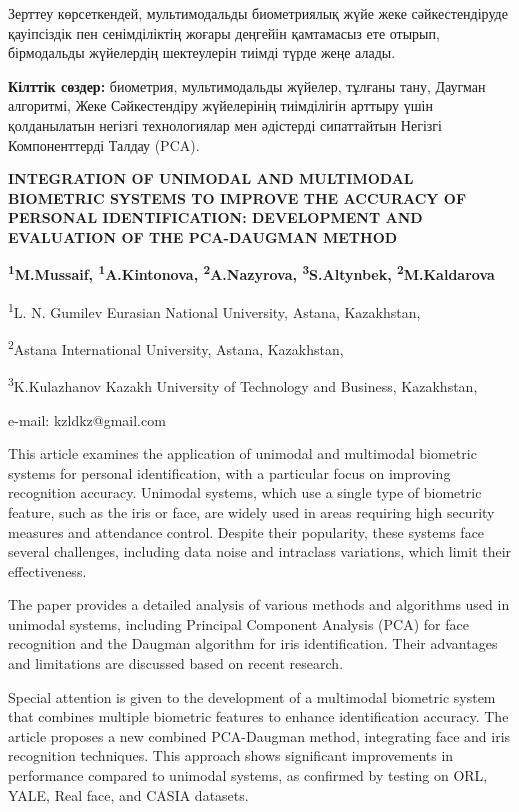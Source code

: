 Зерттеу көрсеткендей, мультимодальды биометриялық жүйе жеке
сәйкестендіруде қауіпсіздік пен сенімділіктің жоғары деңгейін қамтамасыз
ете отырып, бірмодальды жүйелердің шектеулерін тиімді түрде жеңе алады.

{\bfseries Кілттік сөздер:} биометрия, мультимодальды жүйелер, тұлғаны
тану, Даугман алгоритмі, Жеке Сәйкестендіру жүйелерінің тиімділігін
арттыру үшін қолданылатын негізгі технологиялар мен әдістерді
сипаттайтын Негізгі Компоненттерді Талдау (PCA).

\begin{center}
{\large\bfseries INTEGRATION OF UNIMODAL AND MULTIMODAL BIOMETRIC SYSTEMS TO
IMPROVE THE ACCURACY OF PERSONAL IDENTIFICATION: DEVELOPMENT AND
EVALUATION OF THE PCA-DAUGMAN METHOD}

{\bfseries \textsuperscript{1}M.Mussaif\envelope, \textsuperscript{1}A.Kintonova,
\textsuperscript{2}A.Nazyrova, \textsuperscript{3}S.Altynbek,
\textsuperscript{2}M.Kaldarova}

\textsuperscript{1}L. N. Gumilev Eurasian National University, Astana,
Kazakhstan,

\textsuperscript{2}Astana International University, Astana, Kazakhstan,

\textsuperscript{3}K.Kulazhanov Kazakh University of Technology and
Business, Kazakhstan,

e-mail: kzldkz@gmail.com
\end{center}

This article examines the application of unimodal and multimodal
biometric systems for personal identification, with a particular focus
on improving recognition accuracy. Unimodal systems, which use a single
type of biometric feature, such as the iris or face, are widely used in
areas requiring high security measures and attendance control. Despite
their popularity, these systems face several challenges, including data
noise and intraclass variations, which limit their effectiveness.

The paper provides a detailed analysis of various methods and algorithms
used in unimodal systems, including Principal Component Analysis (PCA)
for face recognition and the Daugman algorithm for iris identification.
Their advantages and limitations are discussed based on recent research.

Special attention is given to the development of a multimodal biometric
system that combines multiple biometric features to enhance
identification accuracy. The article proposes a new combined PCA-Daugman
method, integrating face and iris recognition techniques. This approach
shows significant improvements in performance compared to unimodal
systems, as confirmed by testing on ORL, YALE, Real face, and CASIA
datasets.

